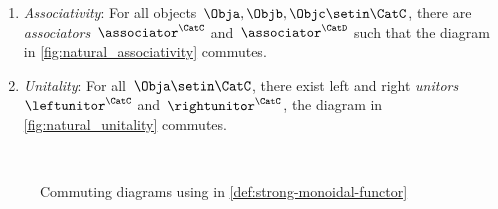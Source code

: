 {\begin{ctdefinition}
    \condit
    \begin{enumerate}
        \item \emph{Associativity}: For all objects~$\Obja,\Objb,\Objc\setin \CatC$, there are  \emph{associators}~$\associator^\CatC$ and~$\associator^\CatD$ such that the diagram in \cref{fig:natural_associativity} commutes.
        \item \emph{Unitality}: For all~$\Obja\setin \CatC$, there exist left and right \emph{unitors}~$\leftunitor^\CatC$ and~$\rightunitor^\CatC$, the diagram in
              \cref{fig:natural_unitality} commutes.
    \end{enumerate}
\end{ctdefinition}
\begin{figure}
    \\
    \caption{Commuting diagrams using in \cref{def:strong-monoidal-functor}}
    \label{fig:strong-monoidal-functor}
\end{figure}

}
